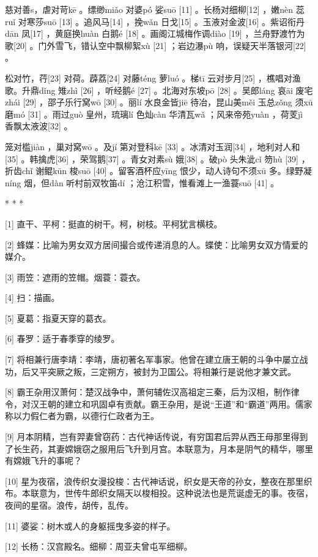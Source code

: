 \documentclass[12pt,UTF8]{ctexbook}
\begin{document}
慈对善s，虐对苛kē 。缥缈miǎo 对婆pó 娑suō [11] 。长杨对细柳[12] ，嫩nèn 蕊ruǐ 对寒莎suō [13] 。追风马[14] ，挽wǎn 日戈[15] 。玉液对金波[16] 。紫诏衔丹dān 凤[17] ，黄庭换huàn 白鹅é [18] 。画阁江城梅作调diào [19] ，兰舟野渡竹为歌[20] 。门外雪飞，错认空中飘柳絮xù [21] ；岩边瀑pù 响，误疑天半落银河[22] 。

松对竹，荇[23] 对荷。薜荔[24] 对藤téng 萝luó 。梯tī 云对步月[25] ，樵唱对渔歌。升鼎dǐng 雉zhì [26] ，听经鹅é [27] 。北海对东坡pō [28] 。吴郎láng 哀āi 废宅zhái [29] ，邵子乐行窝wō [30] 。丽lí 水良金皆jiē 待冶，昆山美měi 玉总zǒng 须xū 磨mó [31] 。雨过guò 皇州，琉璃lí 色灿càn 华清瓦wǎ ；风来帝苑yuàn ，荷芰jì 香飘太液波[32] 。

笼对槛jiàn ，巢对窝wō 。及jí 第对登科kē [33] 。冰清对玉润[34] ，地利对人和[35] 。韩擒虎[36] ，荣驾鹅[37] 。青女对素sù 娥[38] 。破pò 头朱泚cǐ 笏hù [39] ，折齿chǐ 谢鲲kūn 梭suō [40] 。留客酒杯应yīng 恨少，动人诗句不须xū 多。绿野凝níng 烟，但dàn 听村前双牧笛dí ；沧江积雪，惟看滩上一渔蓑suō [41] 。



* * *



[1] 直干、平柯：挺直的树干。柯，树枝。平柯犹言横枝。

[2] 蜂媒：比喻为男女双方居间撮合或传递消息的人。蝶使：比喻男女双方情爱的媒介。

[3] 雨笠：遮雨的笠帽。烟蓑：蓑衣。

[4] 扫：描画。

[5] 夏葛：指夏天穿的葛衣。

[6] 春罗：适于春季穿的绫罗。

[7] 将相兼行唐李靖：李靖，唐初著名军事家。他曾在建立唐王朝的斗争中屡立战功，后又平突厥之叛，三定朔方，被封为卫国公。将相兼行是说他才兼文武。

[8] 霸王杂用汉萧何：楚汉战争中，萧何辅佐汉高祖定三秦，后为汉相，制作律令，对汉王朝的建立和巩固卓有贡献。霸王杂用，是说“王道”和“霸道”两用。儒家称以力假仁者为霸，以德行仁政者为王。

[9] 月本阴精，岂有羿妻曾窃药：古代神话传说，有穷国君后羿从西王母那里得到了长生药，其妻嫦娥窃之服用后飞升到月宫。本联意为，月本是阴气的精华，哪里有嫦娥飞升的事呢？

[10] 星为夜宿，浪传织女漫投梭：古代神话说，织女是天帝的孙女，整夜在那里织布。本联意为，世传牛郎织女隔天以梭相投。这种说法也是荒诞虚无的事。夜宿，夜间的星宿。浪传，胡传，乱传。

[11] 婆娑：树木或人的身躯摇曳多姿的样子。

[12] 长杨：汉宫殿名。细柳：周亚夫曾屯军细柳。
\end{document}
